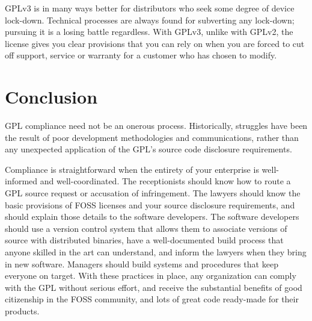\documentclass[letterpaper]{fixme}
\begin{document}
GPLv3 is in many ways better for distributors who seek some degree of
device lock-down.  Technical processes are always found for subverting any
lock-down; pursuing it is a losing battle regardless.  With GPLv3, unlike
with GPLv2, the license gives you clear provisions that you can rely on
when you are forced to cut off support, service or warranty for a customer
who has chosen to modify.

\section{Conclusion}

GPL compliance need not be an onerous process.  Historically, struggles
have been the result of poor development methodologies and communications,
rather than any unexpected application of the GPL's source code disclosure
requirements.

Compliance is straightforward when the entirety of your enterprise is
well-informed and well-coordinated.  The receptionists should know how to
route a GPL source request or accusation of infringement.  The lawyers
should know the basic provisions of FOSS licenses and your source
disclosure requirements, and should explain those details to the software
developers.  The software developers should use a version control system
that allows them to associate versions of source with distributed
binaries, have a well-documented build process that anyone skilled in the
art can understand, and inform the lawyers when they bring in new
software.  Managers should build systems and procedures that keep everyone
on target.  With these practices in place, any organization can comply
with the GPL without serious effort, and receive the substantial benefits
of good citizenship in the FOSS community, and lots of great code
ready-made for their products.

\vfill
\end{document}
